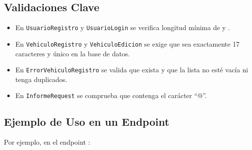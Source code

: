 \documentclass[a4paper,11pt,spanish]{sphinxmanual}
\newcommand{\robotoMonoBold}{\fontseries{b}\selectfont\ttfamily}
\renewcommand{\sphinxcode}[1]{\textcolor{sphinxorangeCode}{{\robotoMonoBold #1}}}
\renewcommand{\sphinxupquote}[1]{\texttt{#1}}
\begin{document}
\subsection{Validaciones Clave}
\label{\detokenize{modelos:validaciones-clave}}\begin{itemize}
\item {} 
\sphinxAtStartPar
En \sphinxcode{\sphinxupquote{UsuarioRegistro}} y \sphinxcode{\sphinxupquote{UsuarioLogin}} se verifica longitud mínima de  y .

\item {} 
\sphinxAtStartPar
En \sphinxcode{\sphinxupquote{VehiculoRegistro}} y \sphinxcode{\sphinxupquote{VehiculoEdicion}} se exige que  sea exactamente 17 caracteres y único en la base de datos.

\item {} 
\sphinxAtStartPar
En \sphinxcode{\sphinxupquote{ErrorVehiculoRegistro}} se valida que  exista y que la lista  no esté vacía ni tenga duplicados.

\item {} 
\sphinxAtStartPar
En \sphinxcode{\sphinxupquote{InformeRequest}} se comprueba que  contenga el carácter “@”.

\end{itemize}


\subsection{Ejemplo de Uso en un Endpoint}
\label{\detokenize{modelos:ejemplo-de-uso-en-un-endpoint}}
\sphinxAtStartPar
Por ejemplo, en el endpoint :
\end{document}
